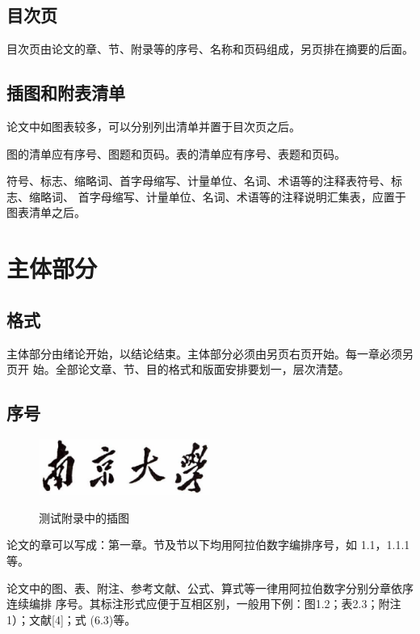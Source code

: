 \documentclass[master]{njuthesis}
\begin{document}
\subsection{目次页}

目次页由论文的章、节、附录等的序号、名称和页码组成，另页排在摘要的后面。

\subsection{插图和附表清单}

论文中如图表较多，可以分别列出清单并置于目次页之后。

图的清单应有序号、图题和页码。表的清单应有序号、表题和页码。

符号、标志、缩略词、首字母缩写、计量单位、名词、术语等的注释表符号、标志、缩略词、
首字母缩写、计量单位、名词、术语等的注释说明汇集表，应置于图表清单之后。

\section{主体部分}

\subsection{格式}

主体部分由绪论开始，以结论结束。主体部分必须由另页右页开始。每一章必须另页开
始。全部论文章、节、目的格式和版面安排要划一，层次清楚。

\subsection{序号}

\begin{figure}[htbp]
  \centering
  \includegraphics[width= 0.5\textwidth]{njuname.eps}\\
  \caption{测试附录中的插图}\label{fig:appendix1}
\end{figure}

论文的章可以写成：第一章。节及节以下均用阿拉伯数字编排序号，如
1.1，1.1.1等。

论文中的图、表、附注、参考文献、公式、算式等一律用阿拉伯数字分别分章依序连续编排
序号。其标注形式应便于互相区别，一般用下例：图1.2；表2.3；附注1）；文献[4]；式
  (6.3)等。
\end{document}
